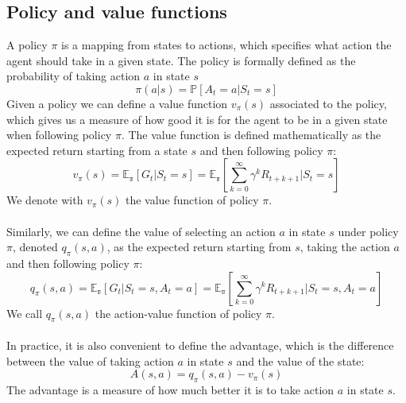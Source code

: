 \subsection{Policy and value functions}
A policy $\pi$ is a mapping from states to actions, which specifies what action the agent should take in a given state. The policy is formally defined as the probability of taking action $a$ in state $s$
\begin{equation}
    \pi(a | s) = \mathds{P}[A_t = a | S_t = s]
    \label{policy}
\end{equation}
Given a policy we can define a value function $v_{\pi}(s)$ associated to the policy, which gives us a measure of how good it is for the agent to be in a given state when following policy $\pi$. The value function is defined mathematically as the expected return starting from a state $s$ and then following policy $\pi$:
\begin{equation}
    v_{\pi}(s) = \mathds{E_{\pi}}[G_t | S_t = s] = \mathds{E_{\pi}}[\sum_{k=0}^{\infty} \gamma^k R_{t+k+1} | S_t = s]
    \label{value-function}
\end{equation}
We denote with $v_{\pi}(s)$ the value function of policy $\pi$.\\\\
Similarly, we can define the value of selecting an action $a$ in state $s$ under policy $\pi$, denoted $q_{\pi}(s, a)$, as the expected return starting from $s$, taking the action $a$ and then following policy $\pi$:
\begin{equation}
    q_{\pi}(s, a) = \mathds{E_{\pi}}[G_t | S_t = s, A_t = a] = \mathds{E_{\pi}}[\sum_{k=0}^{\infty} \gamma^k R_{t+k+1} | S_t = s, A_t = a]
    \label{action-value-function}
\end{equation}
We call $q_{\pi}(s, a)$ the action-value function of policy $\pi$.\\\\
In practice, it is also convenient to define the advantage, which is the difference between the value of taking action $a$ in state $s$ and the value of the state:
\begin{equation}
    A(s, a) = q_{\pi}(s, a) - v_{\pi}(s)
    \label{advantage}
\end{equation}
The advantage is a measure of how much better it is to take action $a$ in state $s$.\\

